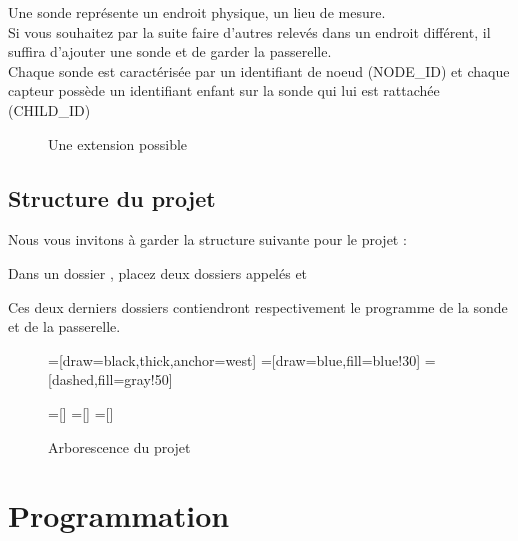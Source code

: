 \documentclass[12pt]{report}
\begin{document}
  Une sonde représente un endroit physique, un lieu de mesure. \\
  Si vous souhaitez par la suite faire d'autres relevés dans un endroit différent, il suffira d'ajouter une sonde et de garder la passerelle.\\
  Chaque sonde est caractérisée par un identifiant de noeud (NODE\_ID) et chaque capteur possède un identifiant enfant sur la sonde qui lui est rattachée (CHILD\_ID)
  \begin{figure}[h]
    \centering
    \caption{Une extension possible}
  \end{figure}





  \section{Structure du projet}

  Nous vous invitons à garder la structure suivante pour le projet : 
  
  Dans un dossier , placez deux dossiers appelés  et 
  
  Ces deux derniers dossiers contiendront respectivement le programme de la sonde et de la passerelle.
  
  
  \begin{figure}[h!]
    \centering
  \usetikzlibrary{trees}
  
  =[draw=black,thick,anchor=west]
  =[draw=blue,fill=blue!30]
  =[dashed,fill=gray!50]
  
  =[]
  =[]
  =[]
  \caption{Arborescence du projet}
  \end{figure}\chapter{Programmation}
\end{document}
